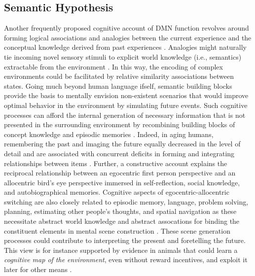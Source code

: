 \documentclass[10pt,letterpaper]{article}
\begin{document}
\subsection{Semantic Hypothesis}
Another frequently proposed cognitive account of DMN function revolves
around forming logical associations and analogies between
the current experience and
the conceptual knowledge derived from past experiences
\citep{bar2007proactive, binder1999conceptual}.
Analogies might naturally tie incoming novel sensory stimuli to
explicit world knowledge (i.e., semantics) extractable from the environment
\citep{bar2009proactive}.
In this way, the encoding of complex environments could be facilitated
by relative similarity associations between states.
%
Going much beyond human language ifself,
semantic building blocks provide the basis to
mentally envision non-existent scenarios
that would improve optimal behavior in the environment
by simulating future events.
Such cognitive processes can afford
the internal generation of necessary information
that is not presented in the surrounding environment
by recombining building blocks of
concept knowledge and episodic memories
\citep{hassabis2009construction}.
Indeed, in aging humans, remembering the past and imaging the future
equally decreased in the level of detail and are associated with
concurrent deficits in forming and integrating relationships between
items \citep{addis2008age, spreng2006temporal}.
Further,
a constructive account explains the reciprocal relationship
between an egocentric first person perspective and
an allocentric bird’s eye perspective immersed in
self-reflection, social knowledge, and autobiographical memories.
%
Cognitive aspects of egocentric-allocentric switching
are also closely related to episodic memory, language, problem solving,
planning, estimating other people's thoughts, and spatial navigation
as these necessitate abstract world knowledge and abstract assocations
for binding the constituent elements in mental scene construction
\citep{schacter2007remembering}.
These scene generation processes could contribute to interpreting the
present and foretelling the future.
This view is for instance supported by evidence in animals that
could learn a \textit{cognitive map of the environment},
even without reward incentives, and exploit it later
for other means \citep{tolman1948cognitive}.
\end{document}
